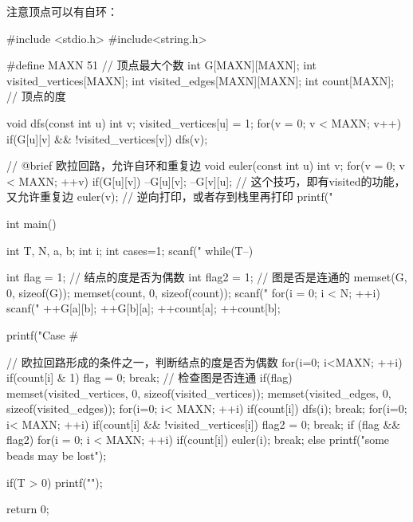注意顶点可以有自环：
\begin{Codex}[label=eulerian_circuit.c]
    #include <stdio.h>
    #include<string.h>

    #define MAXN 51  // 顶点最大个数
    int G[MAXN][MAXN];
    int visited_vertices[MAXN];
    int visited_edges[MAXN][MAXN];
    int count[MAXN]; // 顶点的度

    void dfs(const int u) {
        int v;
        visited_vertices[u] = 1;
        for(v = 0;  v < MAXN; v++) if(G[u][v] && !visited_vertices[v]) {
            dfs(v);
        }
    }

    // @brief 欧拉回路，允许自环和重复边
    void euler(const int u){
        int v;
        for(v = 0; v < MAXN; ++v) if(G[u][v]){
            --G[u][v]; --G[v][u]; // 这个技巧，即有visited的功能，又允许重复边
            euler(v);
            // 逆向打印，或者存到栈里再打印
            printf("%
        }
    }

    int main() {
        int T, N, a, b;
        int i;
        int cases=1;
        scanf("%
        while(T--) {
            int flag = 1; // 结点的度是否为偶数
            int flag2 = 1; // 图是否是连通的
            memset(G, 0, sizeof(G));
            memset(count, 0, sizeof(count));
            scanf("%
            for(i = 0; i < N; ++i){
                scanf("%
                ++G[a][b];
                ++G[b][a];
                ++count[a];
                ++count[b];
            }

            printf("Case #%

            // 欧拉回路形成的条件之一，判断结点的度是否为偶数
            for(i=0; i<MAXN; ++i) {
                if(count[i] & 1){
                    flag = 0;
                    break;
                }
            }
            // 检查图是否连通
            if(flag) {
                memset(visited_vertices, 0, sizeof(visited_vertices));
                memset(visited_edges, 0, sizeof(visited_edges));
                for(i=0; i< MAXN; ++i)
                    if(count[i]) {
                        dfs(i);
                        break;
                    }
                for(i=0; i< MAXN; ++i){
                    if(count[i] && !visited_vertices[i]) {
                        flag2 = 0;
                        break;
                    }
                }
            }
            if (flag && flag2) {
                for(i = 0; i < MAXN; ++i) if(count[i]){
                    euler(i);
                    break;
                }
            } else {
                printf("some beads may be lost\n");
            }

            if(T > 0) printf("\n");
        }
        return 0;
    }
\end{Codex}


